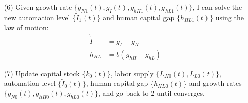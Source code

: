 \documentclass[12pt]{article}
\begin{document}
\begin{itemize}
\item[(6)] Given growth rate $\{g_{N1}(t),g_I(t),g_{hH1}(t),g_{hL1}(t)\}$, I can solve the new automation level $\{\tilde{I}_1(t)\}$ and human capital gap $\{h_{HL1}(t)\}$ using the law of motion: 
\begin{align*}
\dot{\tilde{I}} &= g_I- g_N \\
\dot{h}_{HL} &= b (g_{hH}-g_{hL})
\end{align*}

\item[(7)] Update capital stock $\{k_0(t)\}$, labor supply $\{L_{H0}(t), L_{L0}(t)\}$, automation level $\{\tilde{I}_0(t)\}$, human capital gap $\{h_{HL0}(t)\}$ and growth rates $\{g_{N0}(t),g_{hH0}(t),g_{hL0}(t)\}$, and go back to 2 until converges. 

\end{itemize}
\end{document}
